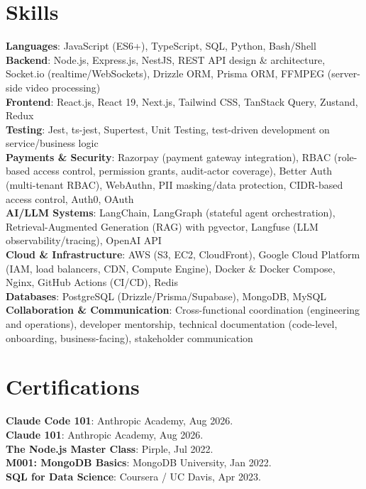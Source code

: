 \documentclass[letterpaper,11pt]{article}
\begin{document}
\section{Skills}
 \begin{itemize}[leftmargin=0.15in, label={}]
    \small{\item{
     \textbf{Languages}{: JavaScript (ES6+), TypeScript, SQL, Python, Bash/Shell} \\
     \textbf{Backend}{: Node.js, Express.js, NestJS, REST API design \& architecture, Socket.io (realtime/WebSockets), Drizzle ORM, Prisma ORM, FFMPEG (server-side video processing)} \\
     \textbf{Frontend}{: React.js, React 19, Next.js, Tailwind CSS, TanStack Query, Zustand, Redux} \\
     \textbf{Testing}{: Jest, ts-jest, Supertest, Unit Testing, test-driven development on service/business logic} \\
     \textbf{Payments \& Security}{: Razorpay (payment gateway integration), RBAC (role-based access control, permission grants, audit-actor coverage), Better Auth (multi-tenant RBAC), WebAuthn, PII masking/data protection, CIDR-based access control, Auth0, OAuth} \\
     \textbf{AI/LLM Systems}{: LangChain, LangGraph (stateful agent orchestration), Retrieval-Augmented Generation (RAG) with pgvector, Langfuse (LLM observability/tracing), OpenAI API} \\
     \textbf{Cloud \& Infrastructure}{: AWS (S3, EC2, CloudFront), Google Cloud Platform (IAM, load balancers, CDN, Compute Engine), Docker \& Docker Compose, Nginx, GitHub Actions (CI/CD), Redis} \\
     \textbf{Databases}{: PostgreSQL (Drizzle/Prisma/Supabase), MongoDB, MySQL} \\
     \textbf{Collaboration \& Communication}{: Cross-functional coordination (engineering and operations), developer mentorship, technical documentation (code-level, onboarding, business-facing), stakeholder communication}
    }}
 \end{itemize}


\section{Certifications}
 \begin{itemize}[leftmargin=0.15in, label={}]
    \small{\item{
     \textbf{Claude Code 101}: Anthropic Academy, Aug 2026. \\
     \textbf{Claude 101}: Anthropic Academy, Aug 2026. \\
     \textbf{The Node.js Master Class}: Pirple, Jul 2022. \\
     \textbf{M001: MongoDB Basics}: MongoDB University, Jan 2022. \\
     \textbf{SQL for Data Science}: Coursera / UC Davis, Apr 2023.
    }}
 \end{itemize}


\end{document}
